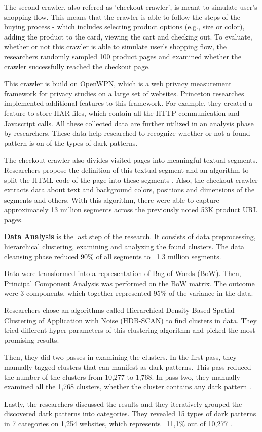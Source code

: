 The second crawler, also refered as 'checkout crawler', is meant to simulate user's shopping flow. This means that the crawler is able to follow the steps of the buying process - which includes selecting product options (e.g., size or color), adding the product to the card, viewing the cart and checking out. To evaluate, whether or not this crawler is able to simulate user's shopping flow, the researchers randomly sampled 100 product pages and examined whether the crawler successfully reached the checkout page.

This crawler is build on OpenWPN, which is a web privacy measurement framework for privacy studies on a large set of websites\cite{github-openwpm}. Princeton researches implemented additional features to this framework. For example, they created a feature to store HAR files, which contain all the HTTP communication and Javascript calls. All these collected data are further utilized in an analysis phase by researchers. These data help researched to recognize whether or not a found pattern is on of the types of dark patterns.

The checkout crawler also divides visited pages into meaningful textual segments. Researchers propose the definition of this textual segment and an algorithm to split the HTML code of the page into these segments \cite{dark-patterns-at-scale}. Also, the checkout crawler extracts data about text and background colors, positions and dimensions of the segments and others. With this algorithm, there were able to capture approximately 13 million segments across the previously noted 53K product URL pages.

\textbf{Data Analysis} is the last step of the research. It consists of data preprocessing, hierarchical clustering, examining and analyzing the found clusters. The data cleansing phase reduced 90\% of all segments to ~1.3 million segments.

Data were transformed into a representation of Bag of Words (BoW)\cite{bag-of-words}. Then, Principal Component Analysis was performed on the BoW matrix. The outcome were 3 components, which together represented 95\% of the variance in the data. 

Researchers chose an algorithms called Hierarchical Density-Based Spatial Clustering of Application with Noise (HDB-SCAN)\cite{hdbscan} to find clusters in data. They tried different hyper parameters of this clustering algorithm and picked the most promising results.

Then, they did two passes in examining the clusters. In the first pass, they manually tagged clusters that can manifest as dark patterns. This pass reduced the number of the clusters from 10,277 to 1,768. In pass two, they manually examined all the 1,768 clusters, whether the cluster contains any dark pattern \cite{dark-patterns-at-scale}.

Lastly, the researchers discussed the results and they iteratively grouped the discovered dark patterns into categories. They revealed 15 types of dark patterns in 7 categories on 1,254 websites, which represents ~11,1\% out of 10,277 \cite{dark-patterns-at-scale}.




